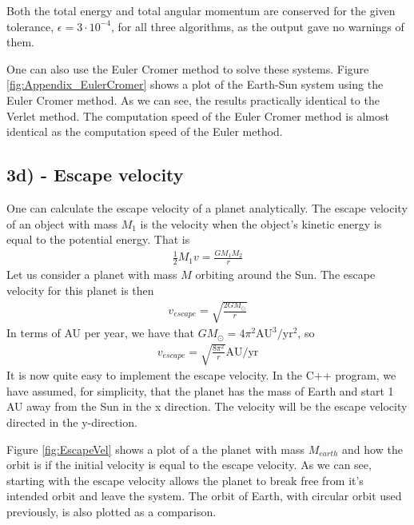 \documentclass[12pt]{article}
\begin{document}
Both the total energy and total angular momentum are conserved for the given tolerance, $\epsilon = 3\cdot 10^{-4}$, for all three algorithms, as the output gave no warnings of them.

One can also use the Euler Cromer method to solve these systems. Figure \ref{fig:Appendix_EulerCromer} shows a plot of the Earth-Sun system using the Euler Cromer method. As we can see, the results practically identical to the Verlet method. The computation speed of the Euler Cromer method is almost identical as the computation speed of the Euler method.
\FloatBarrier

\subsection*{3d) - Escape velocity}
One can calculate the escape velocity of a planet analytically. The escape velocity of an object with mass $M_1$ is the velocity when the object's kinetic energy is equal to the potential energy. That is
\begin{align*}
\frac{1}{2}M_1v = \frac{GM_1M_2}{r}
\end{align*}
Let us consider a planet with mass $M$ orbiting around the Sun. The escape velocity for this planet is then
\begin{align*}
v_{escape} = \sqrt{\frac{2GM_{\odot}}{r}}
\end{align*}
In terms of AU per year, we have that $GM_{\odot} = 4\pi^2 \text{AU}^3/\text{yr}^2$, so
\begin{align*}
v_{escape} = \sqrt{\frac{8\pi^2}{r}} \text{AU}/\text{yr}
\end{align*}
It is now quite easy to implement the escape velocity. In the C++ program, we have assumed, for simplicity, that the planet has the mass of Earth and start 1 AU away from the Sun in the x direction. The velocity will be the escape velocity directed in the y-direction. 

Figure \ref{fig:EscapeVel} shows a plot of a the planet with mass $M_{earth}$ and how the orbit is if the initial velocity is equal to the escape velocity. As we can see, starting with the escape velocity allows the planet to break free from it's intended orbit and leave the system. The orbit of Earth, with circular orbit used previously, is also plotted as a comparison. 
\end{document}
